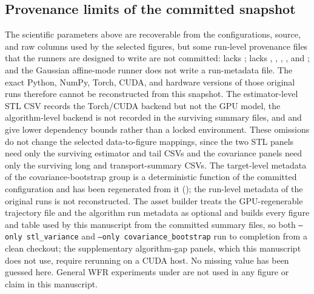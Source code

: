\subsection{Provenance limits of the committed snapshot}

\begingroup\small\raggedright
The scientific parameters above are recoverable from the configurations,
source, and raw columns used by the selected figures, but some run-level
provenance files that the runners are designed to write are not committed:
 lacks
;
 lacks
, ,
, , and
; and the Gaussian affine-mode runner does not
write a run-metadata file. The exact Python, NumPy, Torch, CUDA, and hardware
versions of those original runs therefore cannot be reconstructed from this
snapshot. The estimator-level STL CSV records the Torch/CUDA backend but not the
GPU model, the algorithm-level backend is not recorded in the surviving summary
files, and  and  give lower
dependency bounds rather than a locked environment. These omissions do not
change the selected data-to-figure mappings, since the two STL panels need only
the surviving estimator and tail CSVs and the covariance panels need only the
surviving long and transport-summary CSVs. The target-level metadata of
the covariance-bootstrap group is a deterministic function of the committed
configuration and has been regenerated from it
(); the run-level metadata of the original runs is
not reconstructed. The asset builder 
treats the GPU-regenerable trajectory file 
and the algorithm run metadata as optional and builds every figure and table
used by this manuscript from the committed summary files, so both
\texttt{--only stl\_variance} and \texttt{--only covariance\_bootstrap} run to
completion from a clean checkout; the supplementary algorithm-gap panels, which
this manuscript does not use, require rerunning
 on a CUDA
host. No missing value has been guessed here.
General WFR experiments under  are not used in
any figure or claim in this manuscript.
\par\endgroup

